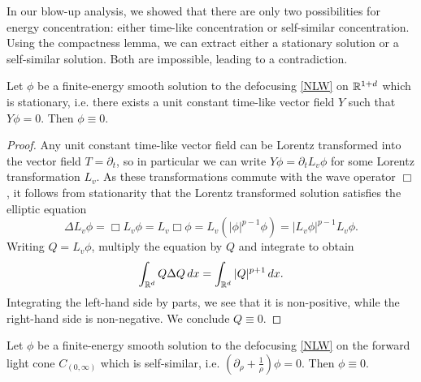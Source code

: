 

In our blow-up analysis, we showed that there are only two possibilities for energy concentration: either time-like concentration or self-similar concentration. Using the compactness lemma, we can extract either a stationary solution or a self-similar solution. Both are impossible, leading to a contradiction. 
	
\begin{proposition}
	Let $\phi$ be a finite-energy smooth solution to the defocusing \eqref{NLW} on $\mathbb R^{1 + d}$ which is stationary, i.e. there exists a unit constant time-like vector field $Y$ such that $Y\phi = 0$. Then $\phi \equiv 0$. 
\end{proposition}	

\begin{proof}
	Any unit constant time-like vector field can be Lorentz transformed into the vector field $T = \partial_t$, so in particular we can write $Y \phi = \partial_t L_v \phi$ for some Lorentz transformation $L_v$. As these transformations commute with the wave operator $\Box$, it follows from stationarity that the Lorentz transformed solution satisfies the elliptic equation
		\[
			\Delta L_v \phi = \Box L_v \phi = L_v \Box \phi = L_v \left( |\phi|^{p - 1} \phi\right) = |L_v \phi|^{p - 1} L_v \phi. 
		\]
	Writing $Q = L_v \phi$, multiply the equation by $Q$ and integrate to obtain 
		\[
			 \int_{\mathbb R^d} Q \Delta Q \, dx = \int_{\mathbb R^d} |Q|^{p + 1} \, dx.
		\]
	Integrating the left-hand side by parts, we see that it is non-positive, while the right-hand side is non-negative. We conclude $Q \equiv 0$.	
\end{proof}

\begin{proposition}
	Let $\phi$ be a finite-energy smooth solution to the defocusing \eqref{NLW} on the forward light cone $C_{(0, \infty)}$ which is self-similar, i.e. $(\partial_\rho + \tfrac1\rho) \phi = 0$. Then $\phi \equiv 0$. 
\end{proposition}

